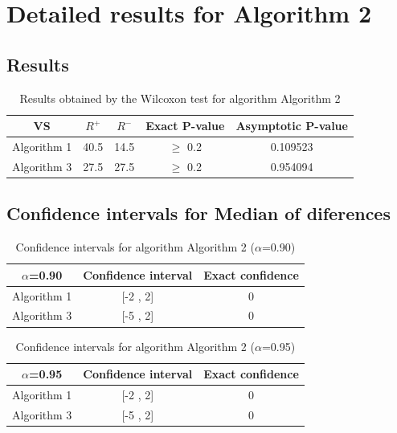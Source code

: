 \documentclass[a4paper,10pt]{article}
\begin{document}
 \clearpage 


\section{Detailed results for Algorithm 2}


\subsection{Results}

\begin{table}[!htp]
\centering\small
\begin{tabular}{
|c|c|c|c|c|}
\hline
 VS & $R^{+}$ & $R^{-}$ & Exact P-value & Asymptotic P-value \\ \hline 
Algorithm 1 & 40.5 & 14.5 & $\geq$ 0.2 & 0.109523\\ \hline 
Algorithm 3 & 27.5 & 27.5 & $\geq$ 0.2 & 0.954094\\ \hline 

\end{tabular}
\caption{Results obtained by the Wilcoxon test for algorithm Algorithm 2}
\end{table}

\subsection{Confidence intervals for Median of diferences}

\begin{table}[!htp]
\centering\small
\begin{tabular}{
|c|c|c|}
\hline
 $\alpha$=0.90 & Confidence interval & Exact confidence \\ \hline 
Algorithm 1 & [-2 , 2] & 0\\ \hline 
Algorithm 3 & [-5 , 2] & 0\\ \hline 

\end{tabular}
\caption{Confidence intervals for algorithm Algorithm 2 ($\alpha$=0.90)}
\end{table}
\begin{table}[!htp]
\centering\small
\begin{tabular}{
|c|c|c|}
\hline
 $\alpha$=0.95 & Confidence interval & Exact confidence \\ \hline 
Algorithm 1 & [-2 , 2] & 0\\ \hline 
Algorithm 3 & [-5 , 2] & 0\\ \hline 

\end{tabular}
\caption{Confidence intervals for algorithm Algorithm 2 ($\alpha$=0.95)}
\end{table}
\end{document}
